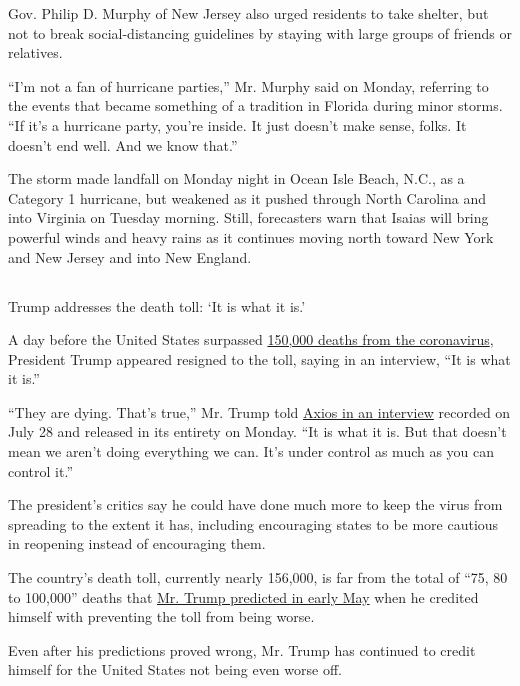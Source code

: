 Gov. Philip D. Murphy of New Jersey also urged residents to take
shelter, but not to break social-distancing guidelines by staying with
large groups of friends or relatives.

``I'm not a fan of hurricane parties,'' Mr. Murphy said on Monday,
referring to the events that became something of a tradition in Florida
during minor storms. ``If it's a hurricane party, you're inside. It just
doesn't make sense, folks. It doesn't end well. And we know that.''

The storm made landfall on Monday night in Ocean Isle Beach, N.C., as a
Category 1 hurricane, but weakened as it pushed through North Carolina
and into Virginia on Tuesday morning. Still, forecasters warn that
Isaias will bring powerful winds and heavy rains as it continues moving
north toward New York and New Jersey and into New England.

\hypertarget{-4}{%
\subsection{}\label{-4}}

Trump addresses the death toll: `It is what it is.'

A day before the United States surpassed
\href{https://www.nytimes3xbfgragh.onion/2020/07/29/us/coronavirus-deaths-150000.html}{150,000
deaths from the coronavirus}, President Trump appeared resigned to the
toll, saying in an interview, ``It is what it is.''

``They are dying. That's true,'' Mr. Trump told
\href{https://www.axios.com/full-axios-hbo-interview-donald-trump-cd5a67e1-6ba1-46c8-bb3d-8717ab9f3cc5.html}{Axios
in an interview} recorded on July 28 and released in its entirety on
Monday. ``It is what it is. But that doesn't mean we aren't doing
everything we can. It's under control as much as you can control it.''

The president's critics say he could have done much more to keep the
virus from spreading to the extent it has, including encouraging states
to be more cautious in reopening instead of encouraging them.

The country's death toll, currently nearly 156,000, is far from the
total of ``75, 80 to 100,000'' deaths that
\href{https://www.nytimes3xbfgragh.onion/2020/05/03/us/politics/trump-coronavirus.html}{Mr.
Trump predicted in early May} when he credited himself with preventing
the toll from being worse.

Even after his predictions proved wrong, Mr. Trump has continued to
credit himself for the United States not being even worse off.

